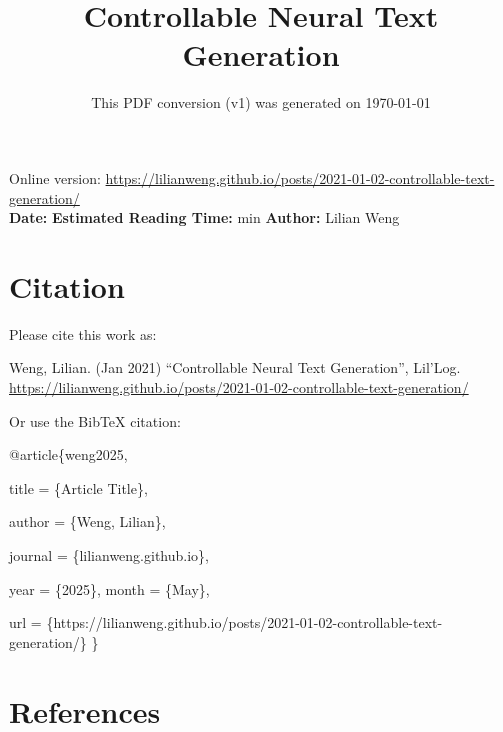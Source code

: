 \documentclass[12pt]{article}
\title{Controllable Neural Text Generation}
\date{This PDF conversion (v1) was generated on \today\footnotemark}
\begin{document}
\maketitle
\begin{center}
    Online version: \url{https://lilianweng.github.io/posts/2021-01-02-controllable-text-generation/} \\
    \textbf{Date:} \quad
    \textbf{Estimated Reading Time:}  min \quad
    \textbf{Author:} Lilian Weng
\end{center}




\newpage
\tableofcontents
\newpage
\vspace{1em}
\n\n\n\section{Citation}
Please cite this work as:

\begin{tcolorbox}[colback=black!5!white, colframe=black!80!white, boxrule=0.5pt, arc=2mm, left=1mm, right=1mm, top=1mm, bottom=1mm]
  Weng, Lilian. (Jan 2021) ``Controllable Neural Text Generation'', Lil'Log. \url{https://lilianweng.github.io/posts/2021-01-02-controllable-text-generation/}
  \end{tcolorbox}

Or use the BibTeX citation:

\begin{tcolorbox}[
    colback=black!5!white,
    colframe=black!80!white,
    boxrule=0.5pt,
    arc=2mm,
    left=1mm,
    right=1mm,
    top=1mm,
    bottom=1mm,
    listing only,
    listing options={
      basicstyle=\ttfamily\footnotesize,
      breaklines=true,
      literate={\{}{{\char`\{}}1 {\}}{{\char`\}}}1
    }
  ]
  @article\{weng2025,

    title   = \{Article Title\},

    author  = \{Weng, Lilian\},

    journal = \{lilianweng.github.io\},

    year    = \{2025\},
    month   = \{May\},

    url     = \{https://lilianweng.github.io/posts/2021-01-02-controllable-text-generation/\}\n
  \}
  \end{tcolorbox}

\newpage
\section{References}

\n
\end{document}
